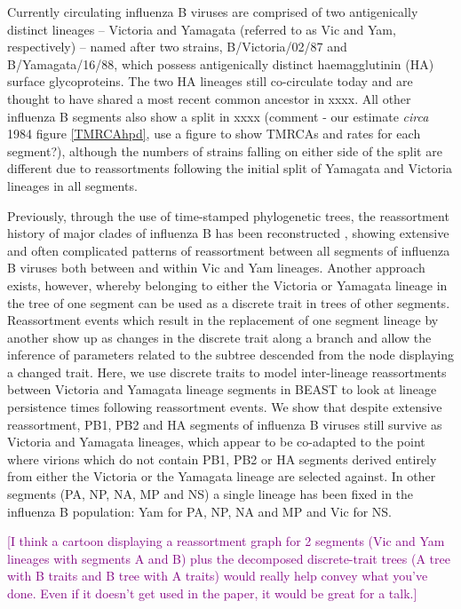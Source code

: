 \documentclass[11pt,oneside,letterpaper]{article}
\def\tbc#1{\textcolor{purple}{[#1]}}
\begin{document}
Currently circulating influenza B viruses are comprised of two antigenically distinct lineages -- Victoria and Yamagata (referred to as Vic and Yam, respectively) -- named after two strains, B/Victoria/02/87 and B/Yamagata/16/88, which possess antigenically distinct haemagglutinin (HA) surface glycoproteins. 
The two HA lineages still co-circulate today and are thought to have shared a most recent common ancestor in xxxx. 
All other influenza B segments also show a split in xxxx (comment - our estimate \textit{circa} 1984 figure \ref{TMRCAhpd}, use a figure to show TMRCAs and rates for each segment?), although the numbers of strains falling on either side of the split are different due to reassortments following the initial split of Yamagata and Victoria lineages in all segments.


Previously, through the use of time-stamped phylogenetic trees, the reassortment history of major clades of influenza B has been reconstructed \cite{chen2008}, showing extensive and often complicated patterns of reassortment between all segments of influenza B viruses both between and within Vic and Yam lineages.
Another approach exists, however, whereby belonging to either the Victoria or Yamagata lineage in the tree of one segment can be used as a discrete trait in trees of other segments.
Reassortment events which result in the replacement of one segment lineage by another show up as changes in the discrete trait along a branch and allow the inference of parameters related to the subtree descended from the node displaying a changed trait.
Here, we use discrete traits to model inter-lineage reassortments between Victoria and Yamagata lineage segments in BEAST to look at lineage persistence times following reassortment events. 
We show that despite extensive reassortment, PB1, PB2 and HA segments of influenza B viruses still survive as Victoria and Yamagata lineages, which appear to be co-adapted to the point where virions which do not contain PB1, PB2 or HA segments derived entirely from either the Victoria or the Yamagata lineage are selected against.
In other segments (PA, NP, NA, MP and NS) a single lineage has been fixed in the influenza B population: Yam for PA, NP, NA and MP and Vic for NS.

\tbc{I think a cartoon displaying a reassortment graph for 2 segments (Vic and Yam lineages with segments A and B) plus the decomposed discrete-trait trees (A tree with B traits and B tree with A traits) would really help convey what you've done.  Even if it doesn't get used in the paper, it would be great for a talk.}
\end{document}
